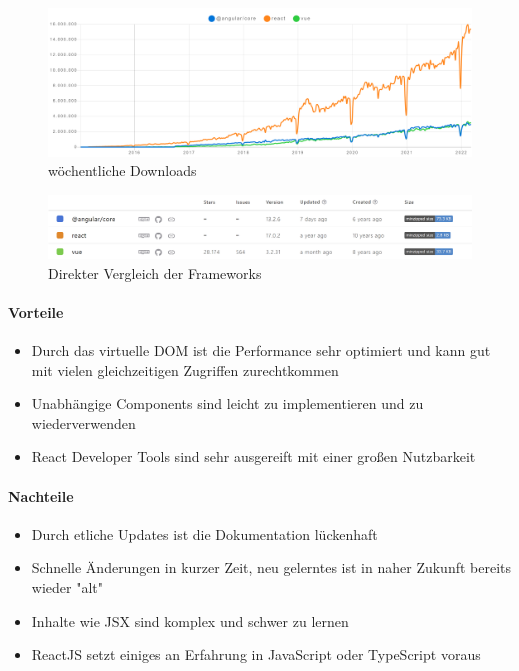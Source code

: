 \begin{figure}
    \centering
    \includegraphics[scale=0.15]{pics/angular-react-vue-npm-chart}
    \caption{wöchentliche Downloads~\cite{angular-react-vue-stats}}
    \label{fig:angular-react-vue-chart}
\end{figure}
\begin{figure}
    \centering
    \includegraphics[scale=0.5]{pics/angular-react-vue-npm-stats}
    \caption{Direkter Vergleich der Frameworks~\cite{angular-react-vue-stats}}
    \label{fig:angular-react-vue-stats}
\end{figure}

\paragraph{Vorteile}
\begin{itemize}
    \item Durch das virtuelle DOM ist die Performance sehr optimiert und kann gut mit vielen gleichzeitigen Zugriffen zurechtkommen
    \item Unabhängige Components sind leicht zu implementieren und zu wiederverwenden
    \item React Developer Tools sind sehr ausgereift mit einer großen Nutzbarkeit
\end{itemize}

\paragraph{Nachteile}
\begin{itemize}
    \item Durch etliche Updates ist die Dokumentation lückenhaft
    \item Schnelle Änderungen in kurzer Zeit, neu gelerntes ist in naher Zukunft bereits wieder "alt"
    \item Inhalte wie JSX sind komplex und schwer zu lernen
    \item ReactJS setzt einiges an Erfahrung in JavaScript oder TypeScript voraus
\end{itemize}

